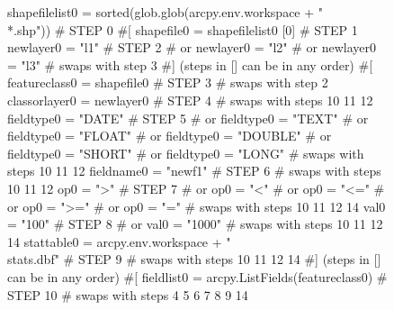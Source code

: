 \begin{figure}
{\scriptsize 
\begin{code}
shapefilelist0 = sorted(glob.glob(arcpy.env.workspace + "\\*.shp"))            \textcolor{black!60}{\# STEP 0}
\textcolor{black!60}{\#[}
shapefile0 = shapefilelist0 [0]                                               \textcolor{black!60}{\# STEP 1}
newlayer0 = "l1"                                                              \textcolor{black!60}{\# STEP 2}
\textcolor{black!60}{\#  or newlayer0 = "l2" }
\textcolor{black!60}{\#  or newlayer0 = "l3" }
\textcolor{black!60}{\#  swaps with step 3}
\textcolor{black!60}{\#] (steps in [] can be in any order)}
\textcolor{black!60}{\#[}
featureclass0 = shapefile0                                                    \textcolor{black!60}{\# STEP 3}
\textcolor{black!60}{\#  swaps with step 2}
classorlayer0 = newlayer0                                                     \textcolor{black!60}{\# STEP 4}
\textcolor{black!60}{\#  swaps with steps 10 11 12}
fieldtype0 = "DATE"                                                           \textcolor{black!60}{\# STEP 5}
\textcolor{black!60}{\#  or fieldtype0 = "TEXT" }
\textcolor{black!60}{\#  or fieldtype0 = "FLOAT" }
\textcolor{black!60}{\#  or fieldtype0 = "DOUBLE" }
\textcolor{black!60}{\#  or fieldtype0 = "SHORT" }
\textcolor{black!60}{\#  or fieldtype0 = "LONG" }
\textcolor{black!60}{\#  swaps with steps 10 11 12}
fieldname0 = "newf1"                                                          \textcolor{black!60}{\# STEP 6}
\textcolor{black!60}{\#  swaps with steps 10 11 12}
op0 = ">"                                                                     \textcolor{black!60}{\# STEP 7}
\textcolor{black!60}{\#  or op0 = "<" }
\textcolor{black!60}{\#  or op0 = "<=" }
\textcolor{black!60}{\#  or op0 = ">=" }
\textcolor{black!60}{\#  or op0 = "=" }
\textcolor{black!60}{\#  swaps with steps 10 11 12 14}
val0 = "100"                                                                  \textcolor{black!60}{\# STEP 8}
\textcolor{black!60}{\#  or val0 = "1000" }
\textcolor{black!60}{\#  swaps with steps 10 11 12 14}
stattable0 = arcpy.env.workspace + "\\stats.dbf"                               \textcolor{black!60}{\# STEP 9}
\textcolor{black!60}{\#  swaps with steps 10 11 12 14}
\textcolor{black!60}{\#] (steps in [] can be in any order)}
\textcolor{black!60}{\#[}
fieldlist0 = arcpy.ListFields(featureclass0)                                  \textcolor{black!60}{\# STEP 10}
\textcolor{black!60}{\#  swaps with steps 4 5 6 7 8 9 14}

\end{code}}
\end{figure}
